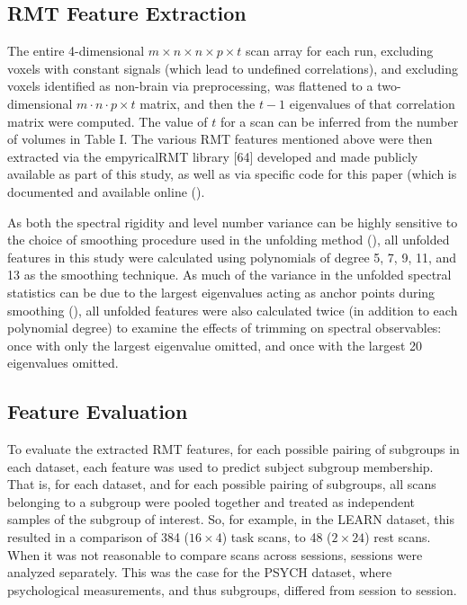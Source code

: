 \subsection{RMT Feature Extraction}
The entire 4-dimensional \(m \times n \times n \times p \times t\) scan array for each run,
excluding voxels with constant signals (which lead to undefined correlations), and excluding voxels
identified as non-brain via preprocessing, was flattened to a two-dimensional \(m \cdot n \cdot p
\times t\) matrix, and then the \(t - 1\) eigenvalues of that correlation matrix were computed. The
value of \(t\) for a scan can be inferred from the number of volumes in Table I. The various RMT
features mentioned above were then extracted via the empyricalRMT library [64] developed and made
publicly available as part of this study, as well as via specific code for this paper (which is
documented and available online (\cite{bergerderekm.DMBergerRandommatrixfmriV02020}).

As both the spectral rigidity and level number variance can be highly sensitive to the choice of
smoothing procedure used in the unfolding method
(\cite{abul-magdUnfoldingSpectrumChaotic2014,moralesImprovedUnfoldingDetrending2011,abueleninSpectralUnfoldingChaotic2018,fossionRandommatrixSpectraTime2013,abueleninEffectUnfoldingSpectral2012}),
all unfolded features in this study were calculated using polynomials of degree 5, 7, 9, 11, and 13
as the smoothing technique. As much of the variance in the unfolded spectral statistics can be due
to the largest eigenvalues acting as anchor points during smoothing
(\cite{moralesImprovedUnfoldingDetrending2011,abueleninEffectUnfoldingSpectral2012}), all unfolded
features were also calculated twice (in addition to each polynomial degree) to examine the effects
of trimming on spectral observables: once with only the largest eigenvalue omitted, and once with
the largest 20 eigenvalues omitted.

\subsection{Feature Evaluation}
To evaluate the extracted RMT features, for each possible pairing of subgroups in each dataset, each
feature was used to predict subject subgroup membership. That is, for each dataset, and for each
possible pairing of subgroups, all scans belonging to a subgroup were pooled together and treated as
independent samples of the subgroup of interest. So, for example, in the LEARN dataset, this
resulted in a comparison of 384 (\(16 \times 4\)) task scans, to 48 (\(2 \times 24\)) rest scans. When it was not
reasonable to compare scans across sessions, sessions were analyzed separately. This was the case
for the PSYCH dataset, where psychological measurements, and thus subgroups, differed from session
to session.

